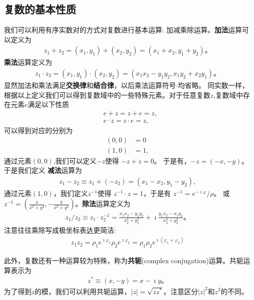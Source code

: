 \subsection{复数的基本性质}
我们可以利用有序实数对的方式对复数进行基本运算: 加减乘除运算。{\bf 加法}运算可以定义为
\begin{align}
    z_1 + z_2 = (x_1, y_1) + (x_2, y_2) = (x_1 + x_2, y_1 + y_2) \textrm{。}
\end{align}
{\bf 乘法}运算定义为
\begin{align}
    z_1 \cdot z_2 = (x_1, y_1) \cdot (x_2, y_2) = (x_1 x_2 - y_1 y_2, x_1 y_2 + x_2 y_1) \textrm{。}
\end{align}
显然加法和乘法满足{\bf 交换律}和{\bf 结合律}，以后乘法运算符号$\cdot$均省略。
同实数一样，根据以上定义我们可以得到复数域中的一些特殊元素。对于任意复数$z$,复数域中存在元素$e$满足以下性质
\begin{align}
    & e + z = z + e = z ,\\ 
    & e \cdot z = z \cdot e = z , 
\end{align}
可以得到对应的分别为
\begin{align}
    (0, 0) &= 0\\
    (1, 0) &= 1 ,
\end{align}
通过元素$(0,0)$,我们可以定义$-z$使得 $-z + z = 0$。 于是有，$- z = (-x, -y)$。于是我们定义
{\bf 减法}运算为 
\begin{align}
    z_1 - z_2 \equiv z_1 + (-z_2) = (x_1 - x_2, y_1 - y_2) ,
\end{align}
通过元素$(1,0)$，我们定义$z^{-1}$使得
$z^{-1} \cdot z = 1$，于是有 $z^{-1} =e^{-\imath \varphi}/\rho  $。
或$z^{-1} = (\frac{x}{x^2 + y^2}, -\frac{y}{x^2 + y^2})$。{\bf 除法}运算定义为
\begin{align}
    z_1 / z_2 \equiv z_1 \cdot z_2^{-1} = \frac{x_1 x_2 - y_1 y_2} {x_2^2  +  y_2^2 }  + \imath \frac{y_1 x_2 - x_1 y_2} {x_2^2  +  y_2^2 } \textrm{。} 
\end{align}
注意往往乘除写成极坐标表达更简洁:
\begin{align}
    z_1 z_2 = \rho_1 e^{\imath \varphi_1 } \rho_2 e^{\imath \varphi_2 } = \rho_1 \rho_2 e^{\imath (\varphi_1 + \varphi_2)}
\end{align}

此外，复数还有一种运算较为特殊，称为{\bf 共轭}(complex conjugation)运算。共轭运算表示为
\begin{align}
    z^{*} \equiv (x, -y) = x - \imath y \textrm{。}
\end{align}
为了得到$z$的模，我们可以利用共轭运算，$|z| = \sqrt{zz^{*}}$。注意区分$|z|^2$和$z^2$的不同。

